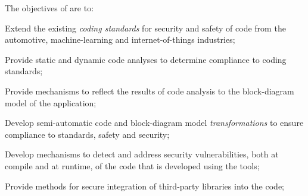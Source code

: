 \addtocounter{wpno}{1}
\begin{Workpackage}{\thewpno}
\WPTitle{\wpname{\thewpno}}

\begin{WPObjectives}
The objectives of \theWP{} are to:

\begin{compactitem}
\item Extend the existing  \emph{coding standards} for security and safety of code from the automotive, machine-learning and internet-of-things industries; 
\item Provide static and dynamic code analyses to determine compliance to coding standards;
\item Provide mechanisms to reflect the results of code analysis to the block-diagram model of the application;
\item Develop semi-automatic code and block-diagram model \emph{transformations} to ensure compliance to standards, safety and security;
\item Develop mechanisms to detect and address security vulnerabilities, both at compile and at runtime, of the code that is developed using the \TheProject{} tools;
\item Provide methods for secure integration of third-party libraries into the \TheProject{} code;
\end{compactitem}




\end{WPObjectives}
\end{Workpackage}
